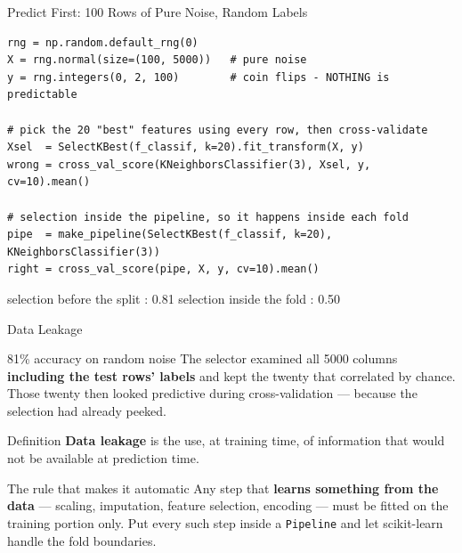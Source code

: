 \documentclass[aspectratio=169]{beamer}
\begin{document}
\begin{frame}[fragile,shrink=6]{Predict First: 100 Rows of Pure Noise, Random Labels}
  \begin{lstlisting}
rng = np.random.default_rng(0)
X = rng.normal(size=(100, 5000))   # pure noise
y = rng.integers(0, 2, 100)        # coin flips - NOTHING is predictable

# pick the 20 "best" features using every row, then cross-validate
Xsel  = SelectKBest(f_classif, k=20).fit_transform(X, y)
wrong = cross_val_score(KNeighborsClassifier(3), Xsel, y, cv=10).mean()

# selection inside the pipeline, so it happens inside each fold
pipe  = make_pipeline(SelectKBest(f_classif, k=20), KNeighborsClassifier(3))
right = cross_val_score(pipe, X, y, cv=10).mean()
  \end{lstlisting}
  \vspace{0.1em}
  \begin{outblk}
selection before the split : 0.81
selection inside the fold  : 0.50
  \end{outblk}
\end{frame}

\begin{frame}[shrink=14]{Data Leakage}
  \begin{alertblock}{81\% accuracy on random noise}
    The selector examined all 5000 columns \textbf{including the test rows'
    labels} and kept the twenty that correlated by chance. Those twenty then
    looked predictive during cross-validation --- because the selection had
    already peeked.
  \end{alertblock}
  \vspace{0.3em}
  \begin{block}{Definition}
    \textbf{Data leakage} is the use, at training time, of information that
    would not be available at prediction time.
  \end{block}
  \vspace{0.3em}
  \begin{block}{The rule that makes it automatic}
    Any step that \textbf{learns something from the data} --- scaling,
    imputation, feature selection, encoding --- must be fitted on the training
    portion only. Put every such step inside a \texttt{Pipeline} and let
    scikit-learn handle the fold boundaries.
  \end{block}
\end{frame}
\end{document}
